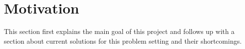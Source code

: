 \section{Motivation}
This section first explains the main goal of this project and follows up with a section about current solutions for this problem setting and their shortcomings.


